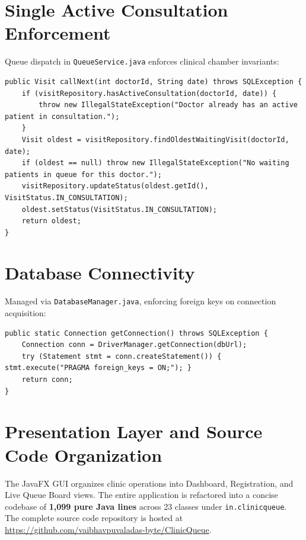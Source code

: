 \documentclass[12pt,a4paper,oneside]{report}
\begin{document}
\section{Single Active Consultation Enforcement}
Queue dispatch in \texttt{QueueService.java} enforces clinical chamber invariants:
\begin{lstlisting}[style=JavaStyle, caption={Call Next Invariant Guard in QueueService.java}]
public Visit callNext(int doctorId, String date) throws SQLException {
    if (visitRepository.hasActiveConsultation(doctorId, date)) {
        throw new IllegalStateException("Doctor already has an active patient in consultation.");
    }
    Visit oldest = visitRepository.findOldestWaitingVisit(doctorId, date);
    if (oldest == null) throw new IllegalStateException("No waiting patients in queue for this doctor.");
    visitRepository.updateStatus(oldest.getId(), VisitStatus.IN_CONSULTATION);
    oldest.setStatus(VisitStatus.IN_CONSULTATION);
    return oldest;
}
\end{lstlisting}

\section{Database Connectivity}
Managed via \texttt{DatabaseManager.java}, enforcing foreign keys on connection acquisition:
\begin{lstlisting}[style=JavaStyle, caption={Connection Factory in DatabaseManager.java}]
public static Connection getConnection() throws SQLException {
    Connection conn = DriverManager.getConnection(dbUrl);
    try (Statement stmt = conn.createStatement()) { stmt.execute("PRAGMA foreign_keys = ON;"); }
    return conn;
}
\end{lstlisting}

\section{Presentation Layer and Source Code Organization}
The JavaFX GUI organizes clinic operations into Dashboard, Registration, and Live Queue Board views. The entire application is refactored into a concise codebase of \textbf{1,099 pure Java lines} across 23 classes under \texttt{in.clinicqueue}. The complete source code repository is hosted at \url{https://github.com/vaibhavpuvaladas-byte/ClinicQueue}.

\end{document}
